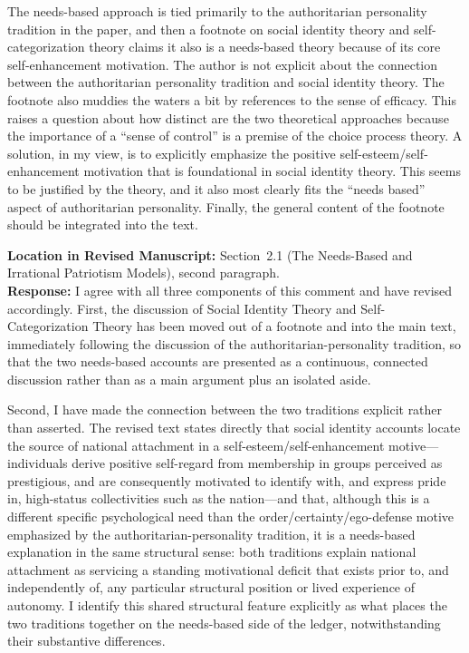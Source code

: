 \documentclass[11pt]{article}
\begin{document}
\begin{reviewercomment}
The needs-based approach is tied primarily to the authoritarian personality tradition in the paper, and then a footnote on social identity theory and self-categorization theory claims it also is a needs-based theory because of its core self-enhancement motivation. The author is not explicit about the connection between the authoritarian personality tradition and social identity theory. The footnote also muddies the waters a bit by references to the sense of efficacy. This raises a question about how distinct are the two theoretical approaches because the importance of a ``sense of control'' is a premise of the choice process theory. A solution, in my view, is to explicitly emphasize the positive self-esteem/self-enhancement motivation that is foundational in social identity theory. This seems to be justified by the theory, and it also most clearly fits the ``needs based'' aspect of authoritarian personality. Finally, the general content of the footnote should be integrated into the text.
\end{reviewercomment}

\noindent\textbf{Location in Revised Manuscript:} Section~2.1 (The Needs-Based and Irrational Patriotism Models), second paragraph.\\[4pt]
\textbf{Response:} I agree with all three components of this comment and have revised accordingly. First, the discussion of Social Identity Theory and Self-Categorization Theory has been moved out of a footnote and into the main text, immediately following the discussion of the authoritarian-personality tradition, so that the two needs-based accounts are presented as a continuous, connected discussion rather than as a main argument plus an isolated aside.

Second, I have made the connection between the two traditions explicit rather than asserted. The revised text states directly that social identity accounts locate the source of national attachment in a self-esteem/self-enhancement motive---individuals derive positive self-regard from membership in groups perceived as prestigious, and are consequently motivated to identify with, and express pride in, high-status collectivities such as the nation---and that, although this is a different specific psychological need than the order/certainty/ego-defense motive emphasized by the authoritarian-personality tradition, it is a needs-based explanation in the same structural sense: both traditions explain national attachment as servicing a standing motivational deficit that exists prior to, and independently of, any particular structural position or lived experience of autonomy. I identify this shared structural feature explicitly as what places the two traditions together on the needs-based side of the ledger, notwithstanding their substantive differences.
\end{document}
